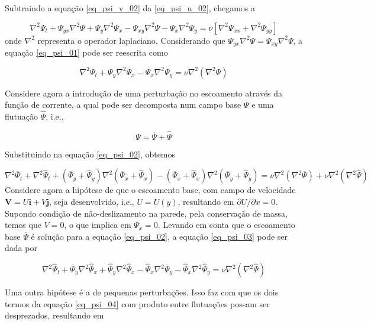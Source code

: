 \documentclass[a4paper,portuguese,10pt]{article}
\newcommand{\Y}{\hat\Psi}
\newcommand{\Yb}{\overline\Psi}
\renewcommand{\D}{\partial}
\renewcommand{\vec}{\mathbf}
\begin{document}
Subtraindo a equação \ref{eq_psi_v_02} da \ref{eq_psi_u_02}, chegamos a

\begin{equation}
  \nabla^2\Psi_t+\Psi_{yx}\nabla^2\Psi+\Psi_y\nabla^2\Psi_x-\Psi_{xy}\nabla^2\Psi-\Psi_x\nabla^2\Psi_y=\nu\left[\nabla^2\Psi_{xx}+\nabla^2\Psi_{yy}\right]
  \label{eq_psi_01}
\end{equation}
onde $\nabla^2$ representa o operador laplaciano. Considerando que $\Psi_{yx}\nabla^2\Psi=\Psi_{xy}\nabla^2\Psi$, a equação \ref{eq_psi_01} pode ser reescrita como

\begin{equation}
  \nabla^2\Psi_t+\Psi_y\nabla^2\Psi_x-\Psi_x\nabla^2\Psi_y=\nu\nabla^2\left(\nabla^2\Psi\right)
  \label{eq_psi_02}
\end{equation}

Considere agora a introdução de uma perturbação no escoamento através da função de corrente, a qual pode ser decomposta num campo base $\Yb$ e uma flutuação $\Y$, i.e.,

\begin{equation}
  \Psi = \Yb+\Y
\end{equation}

Substituindo na equação \ref{eq_psi_02}, obtemos

\begin{equation}
  \nabla^2\Yb_t+\nabla^2\Y_t+(\Yb_y+\Y_y)\nabla^2(\Yb_x+\Y_x)-(\Yb_x+\Y_x)\nabla^2(\Yb_y+\Y_y)=\nu\nabla^2\left(\nabla^2\Yb\right)+\nu\nabla^2\left(\nabla^2\Y\right)
  \label{eq_psi_03}
\end{equation}
Considere agora a hipótese de que o escoamento base, com campo de velocidade $\vec{V}=U\vec{i}+V\vec{j}$, seja desenvolvido, i.e., $U=U(y)$, resultando em $\D U/\D x=0$. Supondo condição de não-deslizamento na parede, pela conservação de massa, temos que $V=0$, o que implica em $\Yb_x=0$. Levando em conta que o escoamento base $\Yb$ é solução para a equação \ref{eq_psi_02}, a equação \ref{eq_psi_03} pode ser dada por

\begin{equation}
  \nabla^2\Y_t+\Yb_y\nabla^2\Y_x+\Y_y\nabla^2\Y_x-\Y_x\nabla^2\Yb_y-\Y_x\nabla^2\Y_y=\nu\nabla^2\left(\nabla^2\Y\right)
  \label{eq_psi_04}
\end{equation}

Uma outra hipótese é a de pequenas perturbações. Isso faz com que os dois termos da equação \ref{eq_psi_04} com produto entre flutuações possam ser desprezados, resultando em
\end{document}
